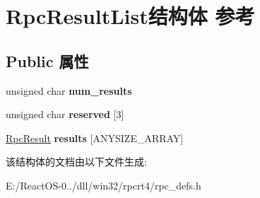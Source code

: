 \hypertarget{struct_rpc_result_list}{}\section{Rpc\+Result\+List结构体 参考}
\label{struct_rpc_result_list}
\subsection*{Public 属性}
\begin{DoxyCompactItemize}
\item 
\mbox{\label{struct_rpc_result_list_a296f63c72d74051aec18375be1d8f88a}} 
unsigned char {\bfseries num\+\_\+results}
\item 
\mbox{\label{struct_rpc_result_list_ac1dc66bdec0653090e9b52d03c518565}} 
unsigned char {\bfseries reserved} \mbox{[}3\mbox{]}
\item 
\mbox{\label{struct_rpc_result_list_a7d4ff1ef718aac075cc75efeb2c2e0e0}} 
\hyperlink{struct_rpc_result}{Rpc\+Result} {\bfseries results} \mbox{[}A\+N\+Y\+S\+I\+Z\+E\+\_\+\+A\+R\+R\+AY\mbox{]}
\end{DoxyCompactItemize}


该结构体的文档由以下文件生成\+:\begin{DoxyCompactItemize}
\item 
E\+:/\+React\+O\+S-\/0../dll/win32/rpcrt4/rpc\+\_\+defs.\+h\end{DoxyCompactItemize}
